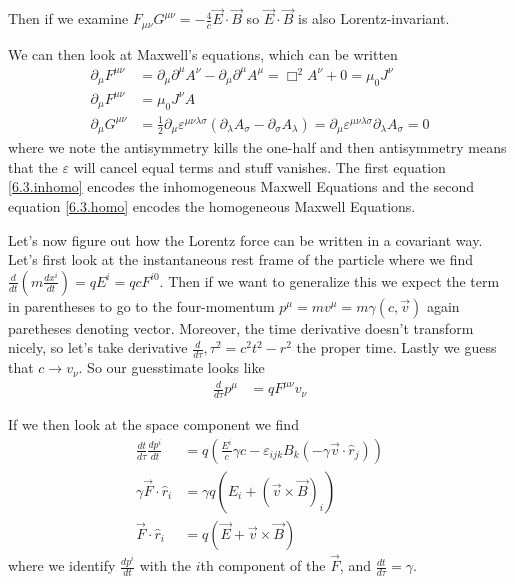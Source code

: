 \documentclass[10pt]{report}
\newcommand{\rd}[2]{\frac{d#1}{d#2}}
\begin{document}
Then if we examine $F_{\mu \nu}G^{\mu \nu} = -\frac{4}{c}\vec{E} \cdot \vec{B}$ so $\vec{E} \cdot \vec{B}$ is also Lorentz-invariant.

We can then look at Maxwell's equations, which can be written
\begin{align}
    \partial_\mu F^{\mu \nu} &= \partial_\mu \partial^\mu A^\nu - \partial_\mu \partial^\mu A^\mu = \Box^2 A^\nu + 0 = \mu_0 J^\nu\\
    \partial_\mu F^{\mu \nu} &= \mu_0 J^\nu A\label{6.3.inhomo}\\
    \partial_\mu G^{\mu \nu} &= \frac{1}{2}\partial_\mu \varepsilon^{\mu \nu \lambda \sigma}\left( \partial_\lambda A_\sigma - \partial_\sigma A_\lambda \right) = \partial_\mu \varepsilon^{\mu \nu \lambda \sigma}\partial_\lambda A_\sigma = 0 \label{6.3.homo}
\end{align}
where we note the antisymmetry kills the one-half and then antisymmetry means that the $\varepsilon$ will cancel equal terms and stuff vanishes. The first equation \eqref{6.3.inhomo} encodes the inhomogeneous Maxwell Equations and the second equation \eqref{6.3.homo} encodes the homogeneous Maxwell Equations.

Let's now figure out how the Lorentz force can be written in a covariant way. Let's first look at the instantaneous rest frame of the particle where we find $\rd{}{t}\left( m\rd{x^i}{t} \right) = qE^i = qcF^{i0}$. Then if we want to generalize this we expect the term in parentheses to go to the four-momentum $p^\mu = mv^\mu = m\gamma(c,\vec{v})$ again paretheses denoting vector. Moreover, the time derivative doesn't transform nicely, so let's take derivative $\rd{}{\tau}, \tau^2 = c^2t^2 - r^2$ the proper time. Lastly we guess that $c \to v_\nu$. So our guesstimate looks like
\begin{align}
    \rd{}{\tau}p^\mu &= qF^{\mu \nu}v_\nu
\end{align}

If we then look at the space component we find
\begin{align}
    \rd{t}{\tau}\rd{p^i}{t} &= q\left( \frac{E^i}{c}\gamma c - \varepsilon_{ijk}B_k\left( -\gamma \vec{v} \cdot \hat{r}_j \right) \right)\\
    \gamma \vec{F} \cdot \hat{r}_i &= \gamma q\left( E_i + \left( \vec{v} \times \vec{B} \right)_i \right)\\
    \vec{F} \cdot \hat{ r}_i &= q\left( \vec{E} + \vec{v} \times \vec{B} \right)
\end{align}
where we identify $\rd{p^i}{t}$ with the $i$th component of the $\vec{F}$, and $\rd{t}{\tau} = \gamma$.
\end{document}
